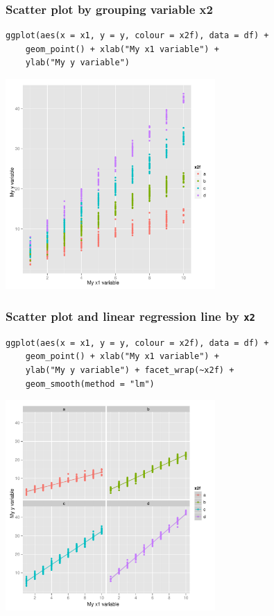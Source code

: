 \documentclass[bigger]{beamer}
\begin{document}
\begin{frame}[fragile,shrink = 10]
\frametitle{Scatter plot by grouping variable x2}
\label{sec-3_7}

\lstset{language=R}
\begin{lstlisting}
ggplot(aes(x = x1, y = y, colour = x2f), data = df) + 
    geom_point() + xlab("My x1 variable") + 
    ylab("My y variable")
\end{lstlisting}



\includegraphics[width=0.6\textwidth]{../graphs/ggplot2_scatter_g.pdf}
\end{frame}
\begin{frame}[fragile,shrink = 15]
\frametitle{Scatter plot and linear regression line by \texttt{x2}}
\label{sec-3_8}

\lstset{language=R}
\begin{lstlisting}
ggplot(aes(x = x1, y = y, colour = x2f), data = df) + 
    geom_point() + xlab("My x1 variable") + 
    ylab("My y variable") + facet_wrap(~x2f) +
    geom_smooth(method = "lm")
\end{lstlisting}



\includegraphics[width=0.6\textwidth]{../graphs/ggplot2_scatter_reg.pdf}
\end{frame}
\end{document}
